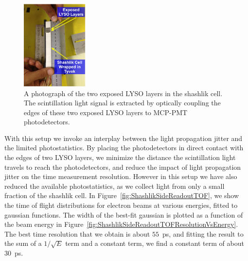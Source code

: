 \begin{figure}[H] \centering
\includegraphics[width=0.30\textwidth]{figs/timing/ShashlikSideReadoutPhotoA} 
\caption{A photograph of the two exposed LYSO layers in the shashlik cell.
The scintillation light signal is extracted by optically coupling
the edges of these two exposed LYSO layers to MCP-PMT
photodetectors. } 
\label{fig:ShashlikSideReadoutExposedLayersPhoto}
\end{figure}


With this setup we invoke an interplay between the light propagation jitter 
and the limited photostatistics. By placing the photodetectors in direct contact with the edges 
of two LYSO layers, we minimize the distance the scintillation light  travels to reach the 
photodetectors, and reduce the impact of light propagation jitter on the time measurement 
resolution. However in this setup we have also reduced the available photostatistics, as we collect 
light from only a small fraction of the shashlik cell. In Figure~\ref{fig:ShashlikSideReadoutTOF},
we show the time of flight distributions for electron beams at various energies,
fitted to gaussian functions. The width of the best-fit gaussian is plotted as a
function of the beam energy in Figure~\ref{fig:ShashlikSideReadoutTOFResolutionVsEnergy}. The 
best time resolution that we obtain is about $55$~ps, and fitting the result to the sum of
a $1/\sqrt{E}$ term and a constant term, we find a constant term of about
$30$~ps. 

